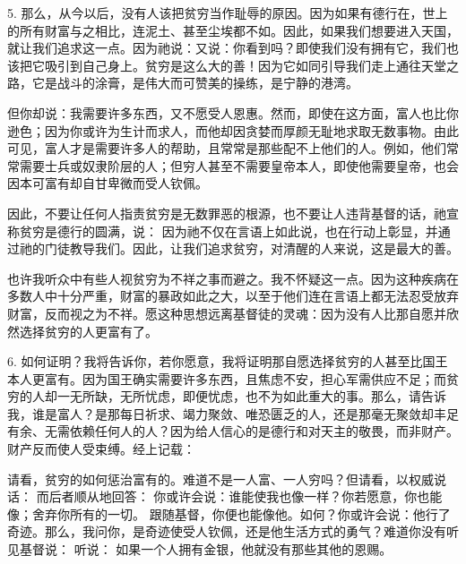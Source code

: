 5. 那么，从今以后，没有人该把贫穷当作耻辱的原因。因为如果有德行在，世上的所有财富与之相比，连泥土、甚至尘埃都不如。因此，如果我们想要进入天国，就让我们追求这一点。因为祂说：又说：你看到吗？即使我们没有拥有它，我们也该把它吸引到自己身上。贫穷是这么大的善！因为它如同引导我们走上通往天堂之路，它是战斗的涂膏，是伟大而可赞美的操练，是宁静的港湾。\par

但你却说：我需要许多东西，又不愿受人恩惠。然而，即使在这方面，富人也比你逊色；因为你或许为生计而求人，而他却因贪婪而厚颜无耻地求取无数事物。由此可见，富人才是需要许多人的帮助，且常常是那些配不上他们的人。例如，他们常常需要士兵或奴隶阶层的人；但穷人甚至不需要皇帝本人，即使他需要皇帝，也会因本可富有却自甘卑微而受人钦佩。\par

因此，不要让任何人指责贫穷是无数罪恶的根源，也不要让人违背基督的话，祂宣称贫穷是德行的圆满，说： 因为祂不仅在言语上如此说，也在行动上彰显，并通过祂的门徒教导我们。因此，让我们追求贫穷，对清醒的人来说，这是最大的善。\par

也许我听众中有些人视贫穷为不祥之事而避之。我不怀疑这一点。因为这种疾病在多数人中十分严重，财富的暴政如此之大，以至于他们连在言语上都无法忍受放弃财富，反而视之为不祥。愿这种思想远离基督徒的灵魂：因为没有人比那自愿并欣然选择贫穷的人更富有了。\par

6. 如何证明？我将告诉你，若你愿意，我将证明那自愿选择贫穷的人甚至比国王本人更富有。因为国王确实需要许多东西，且焦虑不安，担心军需供应不足；而贫穷的人却一无所缺，无所忧虑，即便忧虑，也不为如此重大的事。那么，请告诉我，谁是富人？是那每日祈求、竭力聚敛、唯恐匮乏的人，还是那毫无聚敛却丰足有余、无需依赖任何人的人？因为给人信心的是德行和对天主的敬畏，而非财产。财产反而使人受束缚。经上记载：\par

请看，贫穷的如何惩治富有的。难道不是一人富、一人穷吗？但请看，以权威说话： 而后者顺从地回答： 你或许会说：谁能使我也像一样？你若愿意，你也能像；舍弃你所有的一切。 跟随基督，你便也能像他。如何？你或许会说：他行了奇迹。那么，我问你，是奇迹使受人钦佩，还是他生活方式的勇气？难道你没有听见基督说： 听说： 如果一个人拥有金银，他就没有那些其他的恩赐。\par

